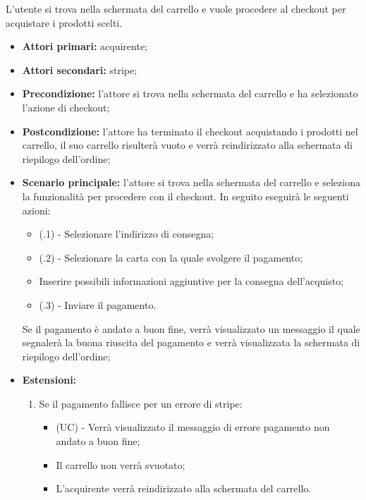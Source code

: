 L'utente si trova nella schermata del carrello e vuole procedere al checkout per acquistare i prodotti scelti.
\begin{itemize}
    \item \textbf{Attori primari:} acquirente;
    \item \textbf{Attori secondari:} stripe;
    \item \textbf{Precondizione:} l'attore si trova nella schermata del carrello e ha selezionato l'azione di checkout;
    \item \textbf{Postcondizione:} l'attore ha terminato il checkout acquistando i prodotti nel carrello, il suo carrello risulterà vuoto e verrà reindirizzato alla schermata di riepilogo dell'ordine;
    \item \textbf{Scenario principale:} l'attore si trova nella schermata del carrello e seleziona la funzionalità per procedere con il checkout. In seguito eseguirà le seguenti azioni:
    \begin{itemize}
    	\item (\actualUC.1) - Selezionare l'indirizzo di consegna;
    	\item (\actualUC.2) - Selezionare la carta con la quale svolgere il pagamento;
    	\item Inserire possibili informazioni aggiuntive per la consegna dell'acquisto;
        \item (\actualUC.3) - Inviare il pagamento.
    \end{itemize}
    Se il pagamento è andato a buon fine, verrà visualizzato un messaggio il quale segnalerà la buona riuscita del pagamento e verrà visualizzata la schermata di riepilogo dell'ordine;
    \item \textbf{Estensioni:}
    \begin{enumerate}[label=\lett]
        \item Se il pagamento fallisce per un errore di stripe:
        \begin{itemize}
            \item (UC) - Verrà visualizzato il messaggio di errore pagamento non andato a buon fine;
            \item Il carrello non verrà svuotato;
            \item L'acquirente verrà reindirizzato alla schermata del carrello.
        \end{itemize}
    \end{enumerate}
\end{itemize}

\resetSubUC

